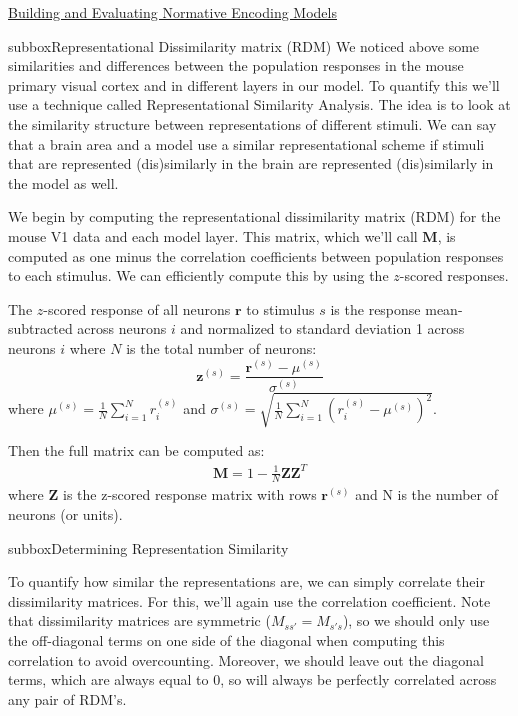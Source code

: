 \begin{textbox}{\href{https://compneuro.neuromatch.io/tutorials/W1D5_DeepLearning/student/W1D5_Tutorial3.html}{Building and Evaluating Normative Encoding Models } }
\begin{subbox}{subbox}{Representational Dissimilarity matrix (RDM)}
\scriptsize
We noticed above some similarities and differences between the population responses in the mouse primary visual cortex and in different layers in our model. To quantify this we’ll use a technique called Representational Similarity Analysis. The idea is to look at the similarity structure between representations of different stimuli. We can say that a brain area and a model use a similar representational scheme if stimuli that are represented (dis)similarly in the brain are represented (dis)similarly in the model as well.

We begin by computing the representational dissimilarity matrix (RDM) for the mouse V1 data and each model layer. This matrix, which we'll call $\mathbf{M}$, is computed as one minus the correlation coefficients between population responses to each stimulus. We can efficiently compute this by using the $z$-scored responses. 

The $z$-scored response of all neurons $\mathbf{r}$ to stimulus $s$ is the response mean-subtracted across neurons $i$ and normalized to standard deviation 1 across neurons $i$ where $N$ is the total number of neurons:
\begin{equation}
  \mathbf{z}^{(s)} = \frac{\mathbf{r}^{(s)} - \mu^{(s)}}
  {\sigma^{(s)}}
\end{equation}
where $\mu^{(s)} = \frac{1}{N}\sum_{i=1}^N r_i^{(s)}$ and 
$\sigma^{(s)} = \sqrt{\frac{1}{N}\sum_{i=1}^N \left( r_i^{(s)} - \mu^{(s)} \right)^2}$.

Then the full matrix can be computed as:
\begin{gather}
  \mathbf{M} = 1 - \frac{1}{N} \mathbf{ZZ}^T
\end{gather}
where $\mathbf{Z}$ is the z-scored response matrix with rows $\mathbf{r}^{(s)}$ and N is the number of neurons (or units).

\end{subbox}
\begin{subbox}{subbox}{Determining Representation Similarity}
\scriptsize

To quantify how similar the representations are, we can simply correlate their dissimilarity matrices. For this, we'll again use the correlation coefficient. Note that dissimilarity matrices are symmetric ($M_{ss'} = M_{s's}$), so we should only use the off-diagonal terms on one side of the diagonal when computing this correlation to avoid overcounting. Moreover, we should leave out the diagonal terms, which are always equal to 0, so will always be perfectly correlated across any pair of RDM's.


\end{subbox}
\end{textbox}
